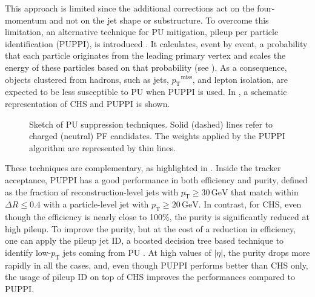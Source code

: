 \documentclass[a4paper,11pt]{article}
\newcommand{\GeV}{\,\si{\giga\electronvolt}\xspace}
\newcommand{\pt}{\ensuremath{p_{\text{T}}}\xspace}
\newcommand{\ptmiss}{\ensuremath{\pt^\text{miss}}\xspace}
\begin{document}
This approach is limited since the additional corrections act on the four-momentum and not on the jet shape or substructure. To overcome this limitation, an alternative technique for PU mitigation, pileup per particle identification (PUPPI), is introduced \citep{Puppi}. It calculates, event by event, a probability that each particle originates from the leading primary vertex and scales the energy of these particles based on that probability (see ). As a consequence, objects clustered from hadrons, such as jets, \ptmiss, and lepton isolation, are expected to be less susceptible to PU when PUPPI is used. In , a schematic representation of CHS and PUPPI is shown.

\begin{figure}[htb]
\centering
{}
\caption{Sketch of PU suppression techniques. Solid (dashed) lines refer to charged (neutral) PF candidates. The weights applied by the PUPPI algorithm are represented by thin lines.}
\label{fig:PileupSketchPU}
\end{figure}

These techniques are complementary, as highlighted in . Inside the tracker acceptance, PUPPI has a good performance in both efficiency and purity, defined as the fraction of reconstruction-level jets with $\pt\geq 30 \GeV$ that match within  $\Delta R\leq 0.4$ with a particle-level jet with $\pt\geq 20 \GeV$. In contrast, for CHS, even though  the efficiency is nearly close to 100\%, the purity is significantly reduced at high pileup. To improve the purity, but at the cost of a reduction in efficiency, one can apply the pileup jet ID, a boosted decision tree based technique to identify low-\pt jets coming from PU \citep{PUIDNotes}. At high values of $|\eta|$, the purity drops more rapidly in all the cases, and, even though PUPPI performs better than CHS only, the usage of pileup ID on top of CHS improves the performances compared to PUPPI. 
\end{document}
